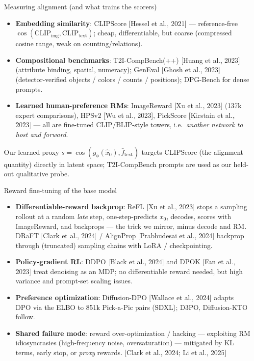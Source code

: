 \documentclass[aspectratio=169,10pt]{beamer}
\newcommand{\cossim}{\operatorname{cos}}
\newcommand{\xhat}{\hat{x}_0}
\newcommand{\ftext}{\bar{f}_{\mathrm{text}}}
\newcommand{\litref}[1]{{\scriptsize\color{black!55}[#1]}}
\begin{document}
\begin{frame}{Measuring alignment (and what trains the scorers)}
  \begin{itemize}
    \item \textbf{Embedding similarity}: CLIPScore
      \litref{Hessel et al., 2021} --- reference-free
      $\cossim(\mathrm{CLIP_{img}}, \mathrm{CLIP_{text}})$; cheap,
      differentiable, but coarse (compressed cosine range, weak on
      counting/relations).
    \item \textbf{Compositional benchmarks}: T2I-CompBench(++)
      \litref{Huang et al., 2023} (attribute binding, spatial, numeracy);
      GenEval \litref{Ghosh et al., 2023} (detector-verified objects /
      colors / counts / positions); DPG-Bench for dense prompts.
    \item \textbf{Learned human-preference RMs}: ImageReward
      \litref{Xu et al., 2023} (137k expert comparisons), HPSv2
      \litref{Wu et al., 2023}, PickScore \litref{Kirstain et al., 2023} ---
      all are fine-tuned CLIP/BLIP-style towers, i.e.\ \emph{another network
      to host and forward}.
  \end{itemize}
  \vspace{0.4em}
  Our learned proxy $s = \cossim(g_\phi(\xhat), \ftext)$ targets CLIPScore
  (the alignment quantity) directly in latent space; T2I-CompBench prompts are
  used as our held-out qualitative probe.
\end{frame}

\begin{frame}{Reward fine-tuning of the base model}
  \begin{itemize}
    \item \textbf{Differentiable-reward backprop}: ReFL
      \litref{Xu et al., 2023} stops a sampling rollout at a random
      \emph{late} step, one-step-predicts $x_0$, decodes, scores with
      ImageReward, and backprops --- the trick we mirror, minus decode and RM.
      DRaFT \litref{Clark et al., 2024} / AlignProp
      \litref{Prabhudesai et al., 2024} backprop through (truncated)
      sampling chains with LoRA / checkpointing.
    \item \textbf{Policy-gradient RL}: DDPO \litref{Black et al., 2024} and
      DPOK \litref{Fan et al., 2023} treat denoising as an MDP; no
      differentiable reward needed, but high variance and prompt-set scaling
      issues.
    \item \textbf{Preference optimization}: Diffusion-DPO
      \litref{Wallace et al., 2024} adapts DPO via the ELBO to 851k
      Pick-a-Pic pairs (SDXL); D3PO, Diffusion-KTO follow.
    \item \textbf{Shared failure mode}: reward over-optimization / hacking
      --- exploiting RM idiosyncrasies (high-frequency noise, oversaturation)
      --- mitigated by KL terms, early stop, or \emph{proxy} rewards.
      \litref{Clark et al., 2024; Li et al., 2025}
  \end{itemize}
\end{frame}
\end{document}
